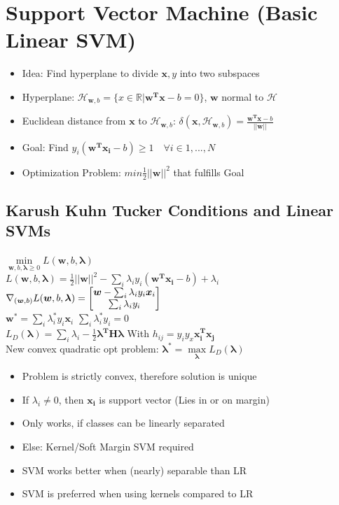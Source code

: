 \documentclass[english]{latex4ei/latex4ei_sheet}
\begin{document}
\section{Support Vector Machine (Basic Linear SVM)}
\begin{sectionbox}
    \begin{itemize}
        \item Idea: Find hyperplane to divide $\boldsymbol{x}, y$ into two subspaces
        \item Hyperplane: $\mathcal{H}_{\boldsymbol{w},b}=\{x\in \mathbb{R} | \boldsymbol{w^Tx}-b=0\}$, $\boldsymbol{w}$ normal to $\mathcal{H}$
        \item Euclidean distance from $\boldsymbol{x}$ to $\mathcal{H}_{\boldsymbol{w},b}$: $\delta(\boldsymbol{x}, \mathcal{H}_{\boldsymbol{w},b})=\frac{\boldsymbol{w^Tx}-b}{||\boldsymbol{w}||}$
        \item Goal: Find $y_i(\boldsymbol{w^Tx_i}-b)\ge 1\quad \forall i \in 1,...,N$
        \item Optimization Problem: $min \frac{1}{2}||\boldsymbol{w}||^2$ that fulfills Goal
    \end{itemize}
    \subsection{Karush Kuhn Tucker Conditions and Linear SVMs}
    \begin{emphbox}
    		$\min\limits_{\boldsymbol{w}, b, \boldsymbol{\lambda}\ge0} L(\boldsymbol{w}, b, \boldsymbol{\lambda})$ \\ 
    		$L(\boldsymbol{w}, b, \boldsymbol{\lambda})= \frac{1}{2}||\boldsymbol{w}||^2 - \sum\limits_i \lambda_i y_i(\boldsymbol{w^Tx_i}-b)+\lambda_i $\\
    		$\nabla_{(\boldsymbol{w},b)}L(\boldsymbol{w}, b, \boldsymbol{\lambda})=\mat{\boldsymbol{w}-\sum_i\lambda_iy_i\boldsymbol{x}_i \\ \sum_i \lambda_iy_i}$\\
			$\boldsymbol{w^*}=\sum_i\lambda^*_iy_i\boldsymbol{x}_i$  \quad $\sum_i \lambda^*_iy_i = 0$\\
			$L_D(\boldsymbol{\lambda})=\sum_i\lambda_i-\frac{1}{2}\boldsymbol{\lambda^TH\lambda}$ \quad With $h_{ij}=y_iy_x\boldsymbol{x_i^Tx_j}$\\
			New convex quadratic opt problem: $\boldsymbol{\lambda^*}=\max\limits_{\boldsymbol{\lambda}}L_D(\boldsymbol{\lambda})$
	\end{emphbox}
	\begin{itemize}
	    \item Problem is strictly convex, therefore solution is unique
	    \item If $\lambda_i \ne 0$, then $\boldsymbol{x_i}$ is support vector (Lies in or on margin)
	    \item Only works, if classes can be linearly separated 
	    \item Else: Kernel/Soft Margin SVM required
	    \item SVM works better when (nearly) separable than LR
	    \item SVM is preferred when using kernels compared to LR
	\end{itemize}
\end{sectionbox}
\end{document}
